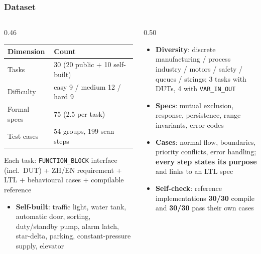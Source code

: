 \documentclass[10pt,aspectratio=169]{beamer}
\begin{document}
\begin{frame}
  \frametitle{Dataset}

  \begin{columns}[T]
    \begin{column}{0.46\textwidth}
      \centering
      \small
      \begin{tabular}{@{}ll@{}}
        \hline
        Dimension & Count \\
        \hline
        Tasks & 30 (20 public + 10 self-built) \\
        Difficulty & easy 9 / medium 12 / hard 9 \\
        Formal specs & 75 (2.5 per task) \\
        Test cases & 54 groups, 199 scan steps \\
        \hline
      \end{tabular}

      \vspace{2mm}
      \raggedright\scriptsize
      Each task: \texttt{FUNCTION\_BLOCK} interface (incl.\ DUT) +
      ZH/EN requirement + LTL + behavioural cases + compilable reference
      \normalsize
      \begin{itemize}
        \item \textbf{Self-built}: traffic light, water tank, automatic door,
              sorting, duty/standby pump, alarm latch, star-delta, parking,
              constant-pressure supply, elevator
      \end{itemize}
    \end{column}
    \begin{column}{0.50\textwidth}
      \begin{itemize}
        \item \textbf{Diversity}: discrete manufacturing / process industry /
              motors / safety / queues / strings; 3 tasks with DUTs,
              4 with \texttt{VAR\_IN\_OUT}
        \item \textbf{Specs}: mutual exclusion, response, persistence,
              range invariants, error codes
        \item \textbf{Cases}: normal flow, boundaries, priority conflicts,
              error handling; \textbf{every step states its purpose} and links
              to an LTL spec
        \item \textbf{Self-check}: reference implementations \textbf{30/30}
              compile and \textbf{30/30} pass their own cases
      \end{itemize}
    \end{column}
  \end{columns}

\end{frame}
\end{document}

